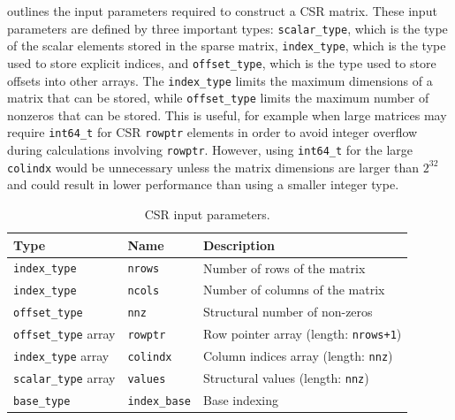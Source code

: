 \documentclass[manuscript,review]{acmart}
\begin{document}
 outlines the input parameters required to construct a CSR matrix. These input parameters are defined by three important types: \texttt{scalar\_type}, which is the type of the scalar elements stored in the sparse matrix, \texttt{index\_type}, which is the type used to store explicit indices, and \texttt{offset\_type}, which is the type used to store offsets into other arrays.  The \texttt{index\_type} limits the maximum dimensions of a matrix that can be stored, while \texttt{offset\_type} limits the maximum number of nonzeros that can be stored.  This is useful, for example when large matrices may require \texttt{int64\_t} for CSR \texttt{rowptr} elements in order to avoid integer overflow during calculations involving \texttt{rowptr}.
However, using \texttt{int64\_t} for the large \texttt{colindx} would be unnecessary unless the matrix dimensions are larger than $2^{32}$ and could result in lower performance than using a smaller integer type.

\begin{table}[htbp]
  \centering
  \caption{CSR input parameters.}
  \label{tab:csr_param}
  \begin{tabularx}{\linewidth}{l l X}
    \toprule
    \textbf{Type} & \textbf{Name} & \textbf{Description} \\
    \midrule
    \texttt{index\_type}        & \texttt{nrows}      & Number of rows of the matrix \\
    \texttt{index\_type}        & \texttt{ncols}      & Number of columns of the matrix \\
    \texttt{offset\_type}       & \texttt{nnz}        & Structural number of non-zeros \\
    \texttt{offset\_type} array & \texttt{rowptr}     & Row pointer array (length: \texttt{nrows+1}) \\
    \texttt{index\_type} array  & \texttt{colindx}    & Column indices array (length: \texttt{nnz}) \\
    \texttt{scalar\_type} array & \texttt{values}     & Structural values (length: \texttt{nnz}) \\
    \texttt{base\_type}         & \texttt{index\_base}& Base indexing \\
    \bottomrule
  \end{tabularx}
\end{table}
\end{document}
